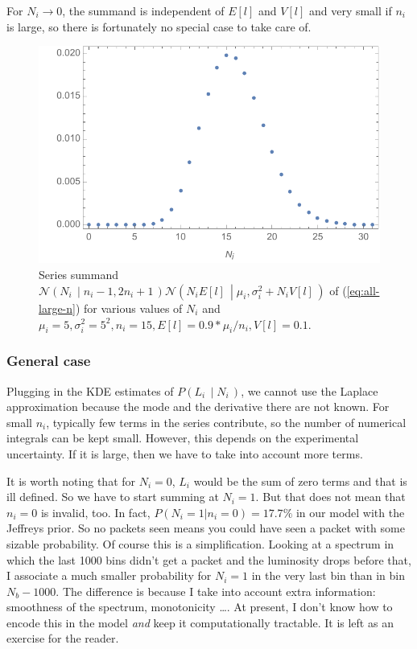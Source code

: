 \documentclass[a4,12pt]{article}
\newcommand{\given}[2]{\left(#1\, \middle| #2 \, \right)}
\newcommand{\gaussian}{\ensuremath{\mathcal{N}}}
\newcommand{\Lumi}{\ensuremath{L_i}}
\newcommand{\mui}{\mu_i}
\newcommand{\sigi}{\sigma_i^2}
\newcommand{\El}{E[l]}
\newcommand{\Vl}{V[l]}
\def \refeq#1{(\ref{eq:#1})}
\begin{document}
For $N_i \to 0$, the summand is independent of $\El$ and $\Vl$ and
very small if $n_i$ is large, so there is fortunately no special case
to take care of.

\begin{figure}[h]
  \centering
  \includegraphics{series}
  \caption{Series summand $\gaussian \given{N_i}{n_i-1, 2 n_i + 1}
    \gaussian \given{N_i \El}{\mu_i, \sigi + N_i \Vl}$ of
    \refeq{all-large-n} for various values of $N_i$ and $\mui=5,
    \sigi=5^2,n_i=15, \El= 0.9 * \mui / n_i, \Vl=0.1$.}
  \label{fig:series}
\end{figure}

\subsubsection*{General case}

Plugging in the KDE estimates of $P\given{\Lumi}{N_i}$, we cannot use
the Laplace approximation because the mode and the derivative there
are not known. For small $n_i$, typically few terms in the series
contribute, so the number of numerical integrals can be kept
small. However, this depends on the experimental uncertainty. If it is
large, then we have to take into account more terms.

It is worth noting that for $N_i=0$, $\Lumi$ would be the sum of zero
terms and that is ill defined. So we have to start summing at
$N_i=1$. But that does not mean that $n_i=0$ is invalid, too. In fact,
$P(N_i=1 | n_i=0) = 17.7\%$ in our model with the Jeffreys prior. So
no packets seen means you could have seen a packet with some sizable
probability. Of course this is a simplification. Looking at a spectrum
in which the last 1000 bins didn't get a packet and the luminosity
drops before that, I associate a much smaller probability for $N_i=1$
in the very last bin than in bin $N_b-1000$. The difference is because
I take into account extra information: smoothness of the spectrum,
monotonicity \dots. At present, I don't know how to encode this in the
model \emph{and} keep it computationally tractable. It is left as an
exercise for the reader.
\end{document}
